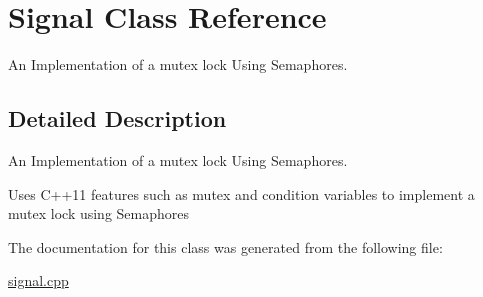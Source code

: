 \hypertarget{class_signal}{}\section{Signal Class Reference}
\label{class_signal}


An Implementation of a mutex lock Using Semaphores.  




\subsection{Detailed Description}
An Implementation of a mutex lock Using Semaphores. 

Uses C++11 features such as mutex and condition variables to implement a mutex lock using Semaphores 

The documentation for this class was generated from the following file\+:\begin{DoxyCompactItemize}
\item 
\hyperlink{signal_8cpp}{signal.\+cpp}\end{DoxyCompactItemize}
